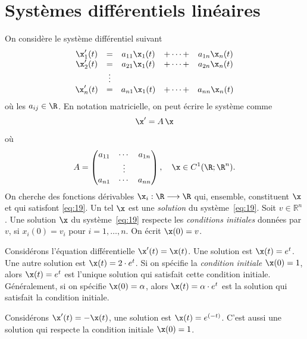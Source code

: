 \chapter{Systèmes différentiels linéaires}
\label{cha:syst-diff-line}

On considère le système différentiel suivant
\begin{equation}
  \label{eq:19}
  \begin{array}{ccccc}
    \x'_1(t) & = &a_{11}\x_1(t) & + \cdots + & a_{1n}\x_n(t) \\
    \x'_2(t) & = &a_{21}\x_1(t) & + \cdots + & a_{2n}\x_n(t) \\
            & \vdots \\             
    \x'_n(t) & = &a_{n1}\x_1(t) & + \cdots + & a_{nn}\x_n(t)
  \end{array}
\end{equation}
où les $a_{ij} \in \R$.  
En notation matricielle, on peut écrire le système comme
\begin{displaymath}
  \x' = A\,\x
\end{displaymath}
où 
\begin{displaymath}
  A =
  \begin{pmatrix}
    a_{11} & \cdots & a_{1n}\\
          & \vdots & \\
          a_{n1} & \cdots & a_{nn}\\          
  \end{pmatrix}, \quad \x \in C^{1}(\R; \R^{n}).
\end{displaymath}
%
On cherche des fonctions dérivables $\x_i: \R \longrightarrow \R$  qui, ensemble, constituent $\x$ et qui  satisfont \eqref{eq:19}. Un tel $\x$ est une \emph{solution} du système~\eqref{eq:19}.
Soit $v ∈ ℝ^n$.  Une solution  $\x$   du système~\eqref{eq:19} respecte les \emph{conditions initiales} données par $v$,  si $x_i(0) = v_i$ pour $i=1,\dots,n$. On écrit  $\x(0) = v $. 



\begin{example}
  \label{exe:49}
  Considérons l'équation différentielle $\x'(t) = \x(t)$. Une solution est $\x(t) = e^t$. Une autre solution est $\x(t) = 2\cdot e^t$. Si on spécifie la \emph{condition initiale} $\x(0) = 1$, alors $\x(t) = e^t$ est l'unique solution qui satisfait cette condition initiale. Généralement, si on spécifie $\x(0) = \alpha$, alors  $\x(t) = \alpha \cdot e^t$ est la solution qui satisfait la condition initiale. 

Considérons $\x'(t) = -\x(t)$, une solution est $\x(t) = e^{(-t)}$. %
C'est aussi une solution qui respecte la condition initiale $\x(0) = 1$. 
\end{example}

